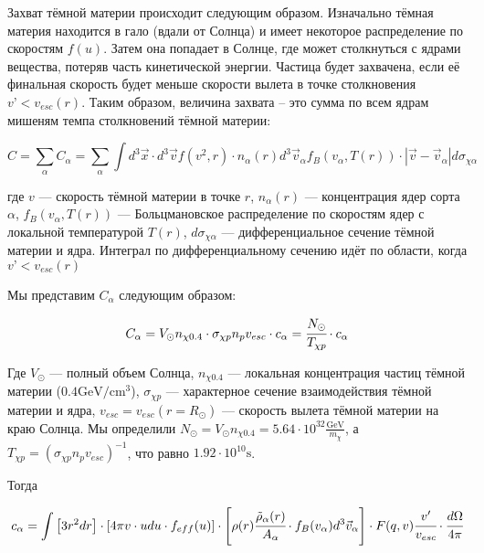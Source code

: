 

Захват тёмной материи происходит следующим образом. Изначально тёмная материя находится в гало (вдали от Солнца) и имеет некоторое распределение по скоростям $f(u)$. Затем она попадает в Солнце, где может столкнуться с ядрами вещества, потеряв часть кинетической энергии. Частица будет захвачена, если её финальная скорость будет меньше скорости вылета в точке столкновения $v’ < v_{esc}(r)$. Таким образом, величина захвата – это сумма по всем ядрам мишеням темпа столкновений тёмной материи:

\begin{equation}
	\label{eq:Capture_Full}
	C = \sum_{\alpha} C_{\alpha} = \sum_{\alpha} \int{
		d^3\vec{x} \cdot d^3\vec{v} f(v^2,r) \cdot n_{\alpha}(r) 
		d^3\vec{v}_{\alpha} f_B(v_{\alpha},T(r)) \cdot
		|\vec{v}- \vec{v}_{\alpha}| d\sigma_{\chi \alpha}
	}
\end{equation}

где $v$ --- скорость тёмной материи в точке $r$, $n_{\alpha}(r)$ --- концентрация ядер сорта $\alpha$, $f_B(v_{\alpha},T(r))$ --- Больцмановское распределение по скоростям ядер с локальной температурой $T(r)$, $d\sigma_{\chi \alpha}$ --- дифференциальное сечение тёмной материи и ядра. Интеграл по дифференциальному сечению идёт по области, когда $v’ < v_{esc}(r)$

Мы представим $C_{\alpha}$ следующим образом:

\begin{equation}
	\label{eq:Capture_a}
	C_{\alpha} = V_{\odot} n_{\chi 0.4} \cdot
	\sigma_{\chi p} n_{p} v_{esc} \cdot c_{\alpha} = 
	\cfrac{N_{\odot}}{T_{\chi p}} \cdot c_{\alpha}
\end{equation}

Где $V_{\odot}$ --- полный объем Солнца, $n_{\chi 0.4}$ --- локальная концентрация частиц тёмной материи ($0.4 \text{GeV}/\text{cm}^{3}$), $\sigma_{\chi p}$ --- характерное сечение взаимодействия тёмной материи и ядра, $v_{esc} = v_{esc}(r = R_{\odot})$ --- скорость вылета тёмной материи на краю Солнца. Мы определили $N_{\odot} = V_{\odot} n_{\chi 0.4} = 5.64\cdot10^{32} \frac{\text{GeV}}{m_{\chi}}$, а $T_{\chi p} = (\sigma_{\chi p} n_{p} v_{esc})^{-1}$, что равно $1.92\cdot 10^{10} \text{s}$.

Тогда 

\begin{equation}
	\label{eq:ca_coeff}
	c_{\alpha} = \int  \left[3r^2 dr  \right] \cdot \left[4\pi v \cdot u d u \cdot f_{eff}(u)  \right]  \cdot 
	\left[ \rho(r)\cfrac{\tilde{\rho}_{\alpha}(r)}{A_{\alpha}}  \cdot f_B(v_{\alpha}) d^3 \vec{v}_{\alpha} 
	\right] \cdot F(q,v) \cfrac{v'}{v_{esc}} \cdot \cfrac{d \Omega}{4\pi} 
\end{equation}

